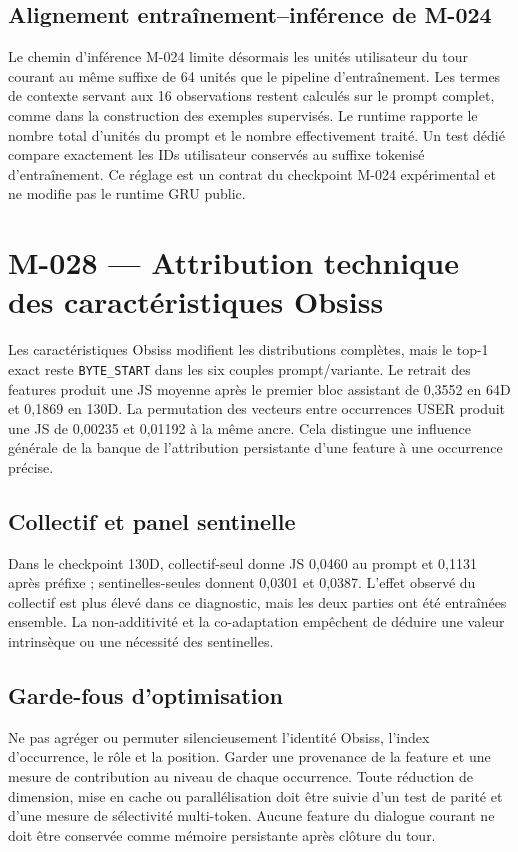 \documentclass[11pt,a4paper]{report}
\begin{document}
\subsection*{Alignement entraînement--inférence de M-024}
Le chemin d’inférence M-024 limite désormais les unités utilisateur du tour courant au même suffixe de 64 unités que le pipeline d’entraînement. Les termes de contexte servant aux 16 observations restent calculés sur le prompt complet, comme dans la construction des exemples supervisés. Le runtime rapporte le nombre total d’unités du prompt et le nombre effectivement traité. Un test dédié compare exactement les IDs utilisateur conservés au suffixe tokenisé d’entraînement. Ce réglage est un contrat du checkpoint M-024 expérimental et ne modifie pas le runtime GRU public.


\section{M-028 — Attribution technique des caractéristiques Obsiss}
Les caractéristiques Obsiss modifient les distributions complètes, mais le top-1 exact reste \texttt{BYTE\_START} dans les six couples prompt/variante. Le retrait des features produit une JS moyenne après le premier bloc assistant de 0,3552 en 64D et 0,1869 en 130D. La permutation des vecteurs entre occurrences USER produit une JS de 0,00235 et 0,01192 à la même ancre. Cela distingue une influence générale de la banque de l'attribution persistante d'une feature à une occurrence précise.

\subsection{Collectif et panel sentinelle}
Dans le checkpoint 130D, collectif-seul donne JS 0,0460 au prompt et 0,1131 après préfixe ; sentinelles-seules donnent 0,0301 et 0,0387. L'effet observé du collectif est plus élevé dans ce diagnostic, mais les deux parties ont été entraînées ensemble. La non-additivité et la co-adaptation empêchent de déduire une valeur intrinsèque ou une nécessité des sentinelles.

\subsection{Garde-fous d'optimisation}
Ne pas agréger ou permuter silencieusement l'identité Obsiss, l'index d'occurrence, le rôle et la position. Garder une provenance de la feature et une mesure de contribution au niveau de chaque occurrence. Toute réduction de dimension, mise en cache ou parallélisation doit être suivie d'un test de parité et d'une mesure de sélectivité multi-token. Aucune feature du dialogue courant ne doit être conservée comme mémoire persistante après clôture du tour.
\end{document}
